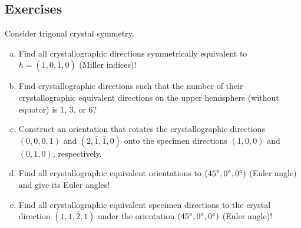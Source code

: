 \subsection*{Exercises}

\begin{frame}

  \begin{Exercise}
    Consider trigonal crystal symmetry.

    \begin{enumerate}[a)]
    \item Find all crystallographic directions symmetrically equivalent to $h
      = (1, 0, \bar 1, 0)$ (Miller indices)!
    \item Find crystallographic directions such that the number of their
      crystallographic equivalent directions on the upper hemisphere (without
      equator) is 1, 3, or 6?
    \item Construct an orientation that rotates the crystallographic
      directions $(0,0,0,1)$ and $(2,\bar 1,\bar 1,0)$ onto the specimen
      directions $(1,0,0)$ and $(0,1,0)$, respectively.
    \item Find all crystallographic equivalent orientations to
      $(45^\circ,0^\circ,0^\circ)$ (Euler angle) and give its Euler angles!
    \item Find all crystallographic equivalent specimen directions to the crystal
      direction $(1,1,\bar 2,1)$ under the orientation
      $(45^\circ,0^\circ,0^\circ)$ (Euler angle)!
    \end{enumerate}

  \end{Exercise}

\end{frame}

